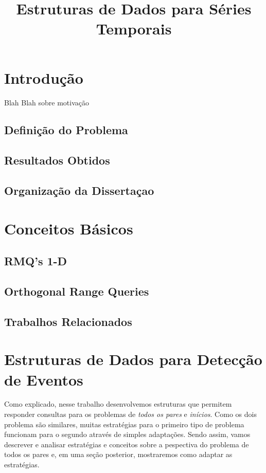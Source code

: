 \documentclass[12pt]{article}
\begin{document}
\nocite{*}

\title{Estruturas de Dados para Séries Temporais}

\maketitle

\section{Introdução}
Blah Blah sobre motivação
\subsection{Definição do Problema}
\subsection{Resultados Obtidos}
\subsection{Organização da Dissertaçao}
 
\section{Conceitos Básicos}
\subsection{RMQ's 1-D}
\subsection{Orthogonal Range Queries}
\subsection{Trabalhos Relacionados}

\section{Estruturas de Dados para Detecção de Eventos}

Como explicado, nesse trabalho desenvolvemos estruturas
que permitem responder consultas para os problemas de \textit{todos os pares} e \textit{inícios}.
Como os dois problema são similares, muitas estratégias
para o primeiro tipo de problema funcionam para o segundo através
de simples adaptações. Sendo assim, vamos descrever e analisar
estratégias e conceitos sobre a pespectiva do problema de 
todos os pares e, em uma seção posterior, mostraremos como adaptar
as estratégias.
\end{document}
